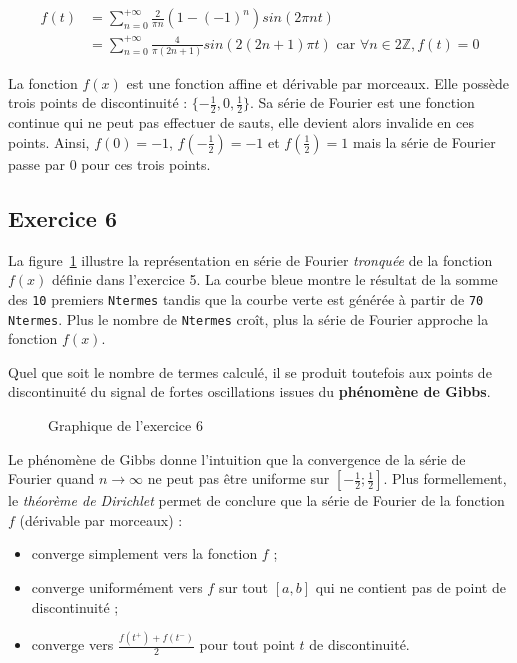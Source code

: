 \documentclass[a4paper,11pt]{article}
\theoremstyle{nonumberplain}
\theoremstyle{nonumberplain}
\theoremstyle{nonumberplain}
\begin{document}
    \begin{equation*}
        \begin{split}
            f(t)    & = \sum\limits_{n = 0}^{+ \infty}\frac{2}{\pi n}(1 - (-1)^n)sin(2 \pi n t) \\
                    & = \sum\limits_{n = 0}^{+ \infty}\frac{4}{\pi (2n+1)}sin(2 (2n+1) \pi t) \text{ car } \forall n \in 2 \mathbb{Z}, f(t) = 0
        \end{split}
    \end{equation*}

    La fonction $f(x)$ est une fonction affine et dérivable par morceaux. Elle possède trois points de discontinuité : $\{-\frac{1}{2}, 0, \frac{1}{2}\}$.
    Sa série de Fourier est une fonction continue qui ne peut pas effectuer de \og sauts\fg, elle devient alors invalide en ces points.
    Ainsi, $f(0) = -1$, $f(-\frac{1}{2}) = -1$ et $f(\frac{1}{2}) = 1$ mais la série de Fourier passe par $0$ pour ces trois points.


\subsection*{Exercice 6}

    La figure~\ref{graph_exo6} illustre la représentation en série de Fourier \textit{tronquée} de la fonction $f(x)$ définie dans l'exercice 5.
    La courbe bleue montre le résultat de la somme des \texttt{10} premiers \texttt{Ntermes} tandis que la courbe verte est générée à partir de \texttt{70 Ntermes}.
    Plus le nombre de \texttt{Ntermes} croît, plus la série de Fourier approche la fonction $f(x)$.

    Quel que soit le nombre de termes calculé, il se produit toutefois aux points de discontinuité
    du signal de fortes oscillations issues du \textbf{phénomène de Gibbs}.

    \begin{figure}[H]
        \caption{\label{graph_exo6} Graphique de l'exercice 6}
    \end{figure}

    Le phénomène de Gibbs donne l'intuition que la convergence de la série de Fourier quand $n \rightarrow \infty$ ne peut pas être uniforme sur $[-\frac{1}{2}; \frac{1}{2}]$.
    Plus formellement, le \textit{théorème de Dirichlet} permet de conclure que la série de Fourier de la fonction $f$ (dérivable par morceaux) :

    \begin{itemize}
        \item
        converge simplement vers la fonction $f$ ;

        \item
        converge uniformément vers $f$ sur tout $[a, b]$ qui ne contient pas de point de discontinuité ;

        \item
        converge vers $ \frac{f(t^{+}) + f(t^{-})}{2}$ pour tout point $t$ de discontinuité.
    \end{itemize}
\end{document}
